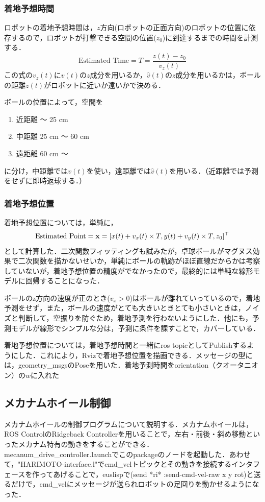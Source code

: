 \documentclass[10pt, oneside, titlepage]{ltjarticle}  %
\begin{document}
    \subsubsection{着地予想時間}
    ロボットの着地予想時間は，$z$方向(ロボットの正面方向)のロボットの位置に依存するので，ロボットが打撃できる空間の位置($z_0$)に到達するまでの時間を計測する．
    \[\mbox{Estimated Time} = T = \frac{z(t)-z_0}{v_z(t)}\]
    この式の$v_z(t)$に$v(t)$の$z$成分を用いるか，$\hat{v}(t)$の$z$成分を用いるかは，ボールの距離$z(t)$がロボットに近いか遠いかで決める．

    ボールの位置によって，空間を
    \begin{enumerate}
    \item 近距離 〜 25 cm
    \item 中距離 25 cm 〜 60 cm
    \item 遠距離 60 cm 〜
    \end{enumerate}
    に分け，中距離では$v(t)$を使い，遠距離では$\hat{v}(t)$を用いる．（近距離では予測をせずに即時返球する．）

    \subsubsection{着地予想位置}
    着地予想位置については，単純に，
    \[\mbox{Estimated Point} = {\bf x} = [x(t)+v_x(t)\times T, y(t)+v_y(t)\times T, z_0]^\top\]
    として計算した．二次関数フィッティングも試みたが，卓球ボールがマグヌス効果で二次関数を描かないせいか，単純にボールの軌跡がほぼ直線だからかは考察していないが，着地予想位置の精度がでなかったので，最終的には単純な線形モデルに回帰することになった．

    ボールのz方向の速度が正のとき($v_x>0$)はボールが離れていっているので，着地予測をせず，また，ボールの速度がとても大きいときとても小さいときは，ノイズと判断して，空振りを防ぐため，着地予測を行わないようにした．他にも，予測モデルが線形でシンプルな分は，予測に条件を課すことで，カバーしている．

    着地予想位置については，着地予想時間と一緒にros topicとしてPublishするようにした．これにより，Rvizで着地予想位置を描画できる．メッセージの型には，geometry\_msgsのPoseを用いた．着地予測時間をorientation（クオータニオン）の$w$に入れた

  \subsection{メカナムホイール制御}
  メカナムホイールの制御プログラムについて説明する．メカナムホイールは，ROS ControlのRidgeback Controllerを用いることで，左右・前後・斜め移動といったメカナム特有の動きをすることができる\cite{mecanum}．mecanum\_drive\_controller.launchでこのpackageのノードを起動した．あわせて，"HARIMOTO-interface.l"でcmd\_velトピックとその動きを接続するインタフェースを作ってあげることで，euslispで(send *ri* :send-cmd-vel-raw x y rot)と送るだけで，cmd\_velにメッセージが送られロボットの足回りを動かせるようになった．
\end{document}
